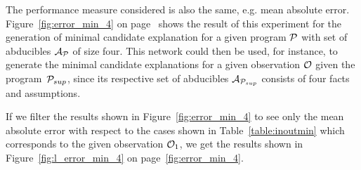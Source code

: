 The performance measure considered is also the same, e.g. mean absolute error. Figure~\ref{fig:error_min_4} on page~\pageref{fig:error_min_4} shows the result of this experiment for the generation of minimal candidate explanation for a given program $\mathcal{P}$ with set of abducibles $\mathcal{A}_{\mathcal{P}}$ of size four. This network could then be used, for instance, to generate the minimal candidate explanations for a given observation $\mathcal{O}$ given the program~$\mathcal{P}_{sup}$, since its respective set of abducibles $\mathcal{A}_{\mathcal{P}_{sup}}$ consists of four facts and assumptions.

If we filter the results shown in Figure~\ref{fig:error_min_4} to see only the mean absolute error with respect to the cases shown in Table~\ref{table:inoutmin} which corresponds to the given observation $\mathcal{O}_1$, we get the results shown in Figure~\ref{fig:l_error_min_4} on page~\ref{fig:error_min_4}.

